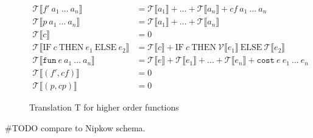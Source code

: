 \begin{figure}
  \begin{align*}
    \mathcal{T}\llbracket f'\ a_{1}\ \dots\ a_{n}\rrbracket &= \mathcal{T}\llbracket a_{1}\rrbracket + \dots + \mathcal{T}\llbracket a_{n}\rrbracket + cf\ a_{1}\ \dots\ a_{n}\\
    \mathcal{T}\llbracket p\ a_{1}\ \dots\ a_{n}\rrbracket &= \mathcal{T}\llbracket a_{1}\rrbracket + \dots + \mathcal{T}\llbracket a_{n}\rrbracket\\
    \mathcal{T}\llbracket c \rrbracket &= 0\\
    \mathcal{T}\llbracket \text{IF}\ c\ \text{THEN}\ e_{1}\ \text{ELSE}\ e_{2}\rrbracket &= \mathcal{T}\llbracket c\rrbracket + \text{IF}\  c\ \text{THEN}\ \mathcal{V}\llbracket e_{1}\rrbracket\ \text{ELSE}\ \mathcal{T}\llbracket e_{2}\rrbracket\\
    \mathcal{T}\llbracket\texttt{fun}\ e\ a_{1}\ \dots\ a_{n}\rrbracket &= \mathcal{T}\llbracket e\rrbracket + \mathcal{T}\llbracket e_{1}\rrbracket + \dots + \mathcal{T}\llbracket e_{n}\rrbracket + \texttt{cost}\ e\ e_{1}\ \dots\ e_{n}\\
    \mathcal{T}\llbracket (f',cf)\rrbracket &= 0\\
    \mathcal{T}\llbracket (p,cp)\rrbracket &= 0
  \end{align*}
  \caption{Translation T for higher order functions}
  \label{fig:higher_T}
\end{figure}

\#TODO compare to Nipkow schema.
